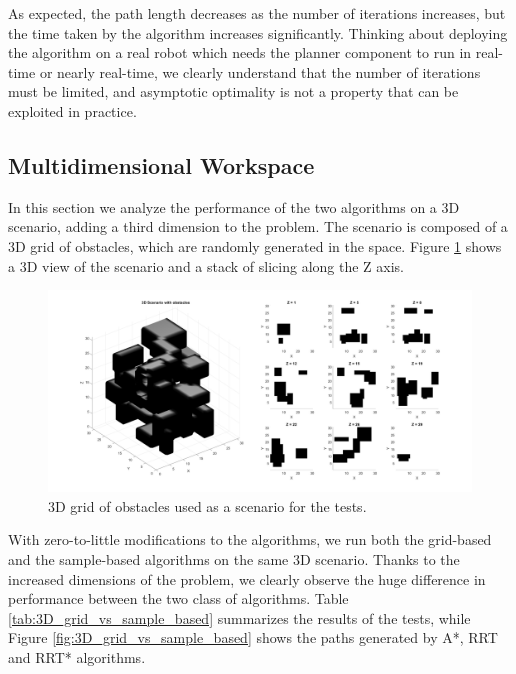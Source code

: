 As expected, the path length decreases as the number of iterations increases, but the time taken by the algorithm increases significantly.
Thinking about deploying the algorithm on a real robot which needs the planner component to run in real-time or nearly real-time, we clearly understand that the number of iterations must be limited, and asymptotic optimality is not a property that can be exploited in practice.



\subsection{Multidimensional Workspace}
\label{subsec:multidimensional_workspace}

In this section we analyze the performance of the two algorithms on a 3D scenario, adding a third dimension to the problem.
The scenario is composed of a 3D grid of obstacles, which are randomly generated in the space.
Figure \ref{fig:3D_obstacles} shows a 3D view of the scenario and a stack of slicing along the Z axis.

\begin{figure}[H]
    \centering
    \includegraphics[width=1.0\textwidth]{./img/MATLAB/multidim/3D_obstacles.pdf}
    \caption{3D grid of obstacles used as a scenario for the tests.}
    \label{fig:3D_obstacles}
\end{figure}

With zero-to-little modifications to the algorithms, we run both the grid-based and the sample-based algorithms on the same 3D scenario.
Thanks to the increased dimensions of the problem, we clearly observe the huge difference in performance between the two class of algorithms.
Table \ref{tab:3D_grid_vs_sample_based} summarizes the results of the tests, while Figure \ref{fig:3D_grid_vs_sample_based} shows the paths generated by A*, RRT and RRT* algorithms.

